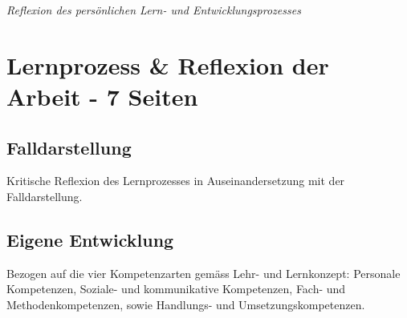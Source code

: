 \textit{Reflexion des persönlichen Lern- und Entwicklungsprozesses}

\section{Lernprozess \& Reflexion der Arbeit - 7 Seiten}\label{Reflexion}
\subsection{Falldarstellung} Kritische Reflexion des Lernprozesses in Auseinandersetzung mit der Falldarstellung.
\subsection{Eigene Entwicklung} Bezogen auf die vier Kompetenzarten gemäss Lehr- und Lernkonzept: Personale Kompetenzen, Soziale- und kommunikative Kompetenzen, Fach- und Methodenkompetenzen, sowie Handlungs- und Umsetzungskompetenzen.

